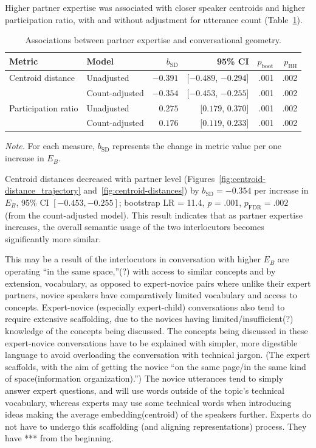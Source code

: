 \documentclass{article}
\begin{document}
Higher partner expertise was associated with closer speaker centroids and higher participation ratio, with and without adjustment for utterance count (Table~\ref{tab:expertise-effects}).

\begin{table}[htbp]
\centering
\small
\caption{Associations between partner expertise and conversational geometry.}
\label{tab:expertise-effects}
\begin{tabular}{llrrrr}
\toprule
Metric & Model & $b_{\mathrm{SD}}$ & 95\% CI
& $p_{\mathrm{boot}}$ & $p_{\mathrm{BH}}$ \\
\midrule
Centroid distance
& Unadjusted     & $-0.391$& [$-0.489$, $-0.294$]& .001 & .002 \\
& Count-adjusted & $-0.354$& [$-0.453$, $-0.255$]& .001 & .002 \\
\addlinespace
Participation ratio
& Unadjusted     & $0.275$  & [$0.179$, $0.370$]   & .001 & .002 \\
& Count-adjusted & $0.176$  & [$0.119$, $0.233$]   & .001 & .002 \\
\bottomrule
\end{tabular}

\medskip
\begin{minipage}{\linewidth}
\footnotesize
\textit{Note.}
For each measure, $b_{\mathrm{SD}}$ represents the change in metric value per one increase in $E_B$.
\end{minipage}
\end{table}

Centroid distances decreased with partner level (Figures~\ref{fig:centroid-distance_trajectory} and~\ref{fig:centroid-distances}) by $b_{\mathrm{SD}} = -0.354$ per increase in $E_B$, 95\% CI $[-0.453, -0.255]$; bootstrap LR = 11.4, \textit{p} = .001, $p_{\mathrm{FDR}} = .002$ (from the count-adjusted model). This result indicates that as partner expertise increases, the overall semantic usage of the two interlocutors becomes significantly more similar.

This may be a result of the interlocutors in conversation with higher $E_B$ are operating “in the same space,”(?)  with access to similar concepts and by extension, vocabulary, as opposed to expert-novice pairs where unlike their expert partners, novice speakers have comparatively limited vocabulary and access to concepts. Expert-novice (especially expert-child) conversations also tend to require extensive scaffolding, due to the novices having limited/insufficient(?) knowledge of the concepts being discussed. The concepts being discussed in these expert-novice conversations have to be explained with simpler, more digestible language to avoid overloading the conversation with technical jargon. (The expert scaffolds, with the aim of getting the novice “on the same page/in the same kind of space(information organization).”) The novice utterances tend to simply answer expert questions, and will use words outside of the topic's technical vocabulary, whereas experts may use some technical words when introducing ideas making the average embedding(centroid) of the speakers further. Experts do not have to undergo this scaffolding (and aligning representations\citep{garrod_joint_2009}) process. They have *** from the beginning.
\end{document}
